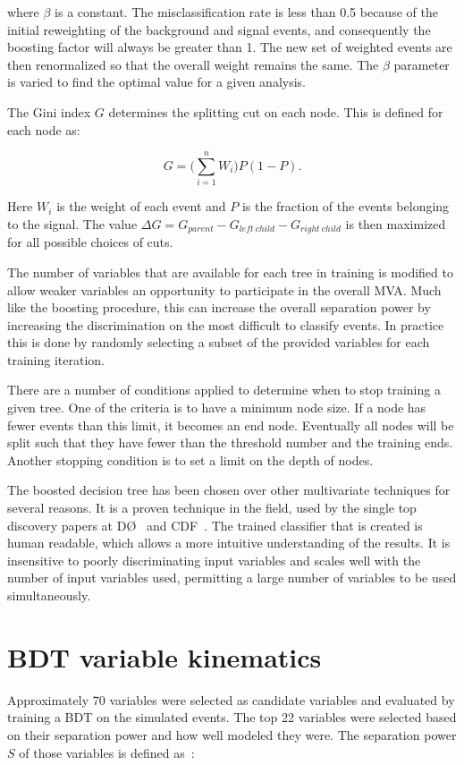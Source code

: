 \noindent
where $\beta$ is a constant. The misclassification rate is less than 0.5 because of the initial reweighting of the background and signal events, and consequently the boosting factor will always be greater than 1. The new set of weighted events are then renormalized so that the overall weight remains the same. The $\beta$ parameter is varied to find the optimal value for a given analysis.

The Gini index $G$ determines the splitting cut on each node. This is defined for each node as:

\begin{equation}
G = \Bigg(\sum\limits_{i=1}^n W_i\Bigg)P(1 - P).
\end{equation}

\noindent
Here $W_i$ is the weight of each event and $P$ is the fraction of the events belonging to the signal. The value $\Delta G = G_{parent} - G_{left\ child} - G_{right\ child}$ is then maximized for all possible choices of cuts.

The number of variables that are available for each tree in training is modified to allow weaker variables an opportunity to participate in the overall MVA. Much like the boosting procedure, this can increase the overall separation power by increasing the discrimination on the most difficult to classify events. In practice this is done by randomly selecting a subset of the provided variables for each training iteration. 

There are a number of conditions applied to determine when to stop training a given tree. One of the criteria is to have a minimum node size. If a node has fewer events than this limit, it becomes an end node. Eventually all nodes will be split such that they have fewer than the threshold number and the training ends. Another stopping condition is to set a limit on the depth of nodes. 

The boosted decision tree has been chosen over other multivariate techniques for several reasons. It is a proven technique in the field, used by the single top discovery papers at D\O~\cite{SGTOP-D0} and CDF~\cite{SGTOP-CDF}. The trained classifier that is created is human readable, which allows a more intuitive understanding of the results. It is insensitive to poorly discriminating input variables and scales well with the number of input variables used, permitting a large number of variables to be used simultaneously. 


\section{BDT variable kinematics}
Approximately 70 variables were selected as candidate variables and evaluated by training a BDT on the simulated events. The top 22 variables were selected based on their separation power and how well modeled they were. The separation power $S$ of those variables is defined as~\cite{TMVA}: 


